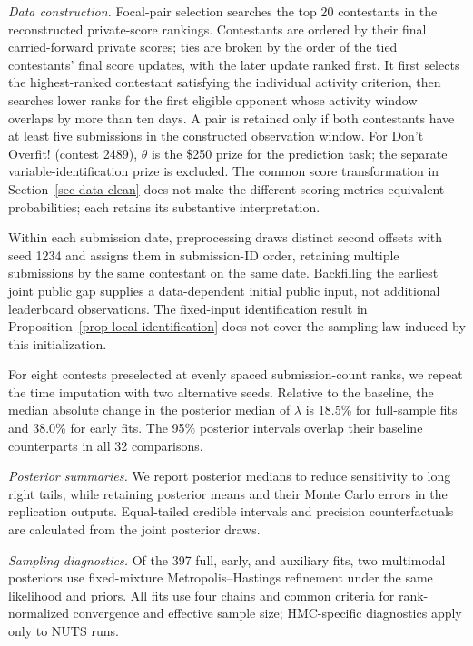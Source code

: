 \documentclass[mnsc]{informs3}
\begin{document}
\begin{APPENDICES}
{\textit{Data construction.}} Focal-pair selection searches the top 20 contestants in the reconstructed private-score rankings. Contestants are ordered by their final carried-forward private scores; ties are broken by the order of the tied contestants' final score updates, with the later update ranked first. It first selects the highest-ranked contestant satisfying the individual activity criterion, then searches lower ranks for the first eligible opponent whose activity window overlaps by more than ten days. A pair is retained only if both contestants have at least five submissions in the constructed observation window. For Don't Overfit! (contest 2489), $\theta$ is the \$250 prize for the prediction task; the separate variable-identification prize is excluded. The common score transformation in Section~\ref{sec-data-clean} does not make the different scoring metrics equivalent probabilities; each retains its substantive interpretation.

Within each submission date, preprocessing draws distinct second offsets with seed 1234 and assigns them in submission-ID order, retaining multiple submissions by the same contestant on the same date. Backfilling the earliest joint public gap supplies a data-dependent initial public input, not additional leaderboard observations. {The fixed-input identification result in Proposition~\ref{prop-local-identification} does not cover the sampling law induced by this initialization.}

For eight contests preselected at evenly spaced submission-count ranks, we repeat the time imputation with two alternative seeds. Relative to the baseline, the median absolute change in the posterior median of $\lambda$ is 18.5\% for full-sample fits and 38.0\% for early fits. The 95\% posterior intervals overlap their baseline counterparts in all 32 comparisons.

\textit{Posterior summaries.} We report posterior medians to reduce sensitivity to long right tails, while retaining posterior means and their Monte Carlo errors in the replication outputs. Equal-tailed credible intervals and precision counterfactuals are calculated from the joint posterior draws.

\textit{Sampling diagnostics.} Of the 397 full, early, and auxiliary fits, two multimodal posteriors use fixed-mixture Metropolis--Hastings refinement under the same likelihood and priors. All fits use four chains and common criteria for rank-normalized convergence and effective sample size; HMC-specific diagnostics apply only to NUTS runs.


\end{APPENDICES}
\end{document}
